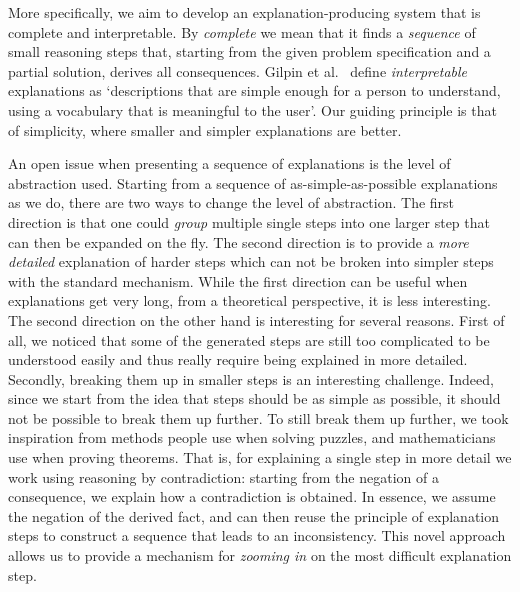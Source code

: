 More specifically, we aim to develop an explanation-producing system that is complete and interpretable. 
By \emph{complete} we mean that it finds a \emph{sequence} of small reasoning steps that, starting from the given problem specification and a partial solution, derives all consequences. 
Gilpin et al.~\cite{DBLP:conf/dsaa/GilpinBYBSK18} define \emph{interpretable} explanations as `descriptions that are simple enough for a person to understand, using a vocabulary that is meaningful to the user'.
Our guiding principle is that of simplicity, where smaller and simpler explanations are better. 

An open issue when presenting a sequence of explanations is the level of abstraction used.
Starting from a sequence of as-simple-as-possible explanations as we do, there are two ways to change the level of abstraction.
The first direction is that one could \emph{group} multiple single steps into one larger step that can then be expanded on the fly. 
The second direction is to provide a \emph{more detailed} explanation of harder steps which can not be broken into simpler steps with the standard mechanism.
While the first direction can be useful when explanations get very long, from a theoretical perspective, it is less interesting. 
The second direction on the other hand is interesting for several reasons. First of all, we noticed that some of the generated steps are still too complicated to be understood easily and thus really require being explained in more detailed. Secondly, breaking them up in smaller steps is an interesting challenge. Indeed, since we start from the idea that steps should be as simple as possible, it should not be possible to break them up further. 
To still break them up further, we took inspiration from methods people use when solving puzzles, and mathematicians use when proving theorems. 
That is, for explaining a single step in more detail we work using reasoning by contradiction: starting from the negation of a consequence, we explain how a contradiction is obtained.  In essence, we assume the negation of the derived fact, and can then reuse the principle of explanation steps to construct a sequence that leads to an inconsistency. 
This novel approach allows us to provide a mechanism for \emph{zooming in} on the most difficult explanation step.

